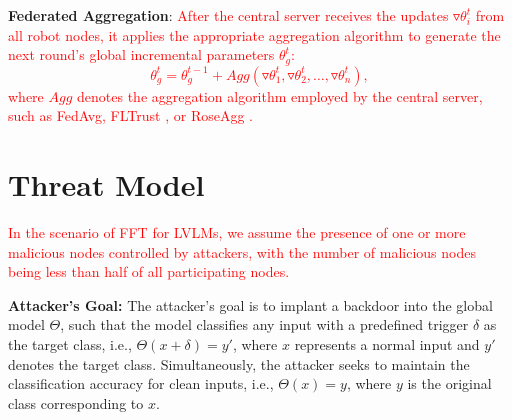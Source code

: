 \documentclass[lettersize,journal]{IEEEtran}
\begin{document}
\textbf{Federated Aggregation}:
\textcolor{red}{After the central server receives the updates $\triangledown \theta_i^t$ from all robot nodes, it applies the appropriate aggregation algorithm to generate the next round's global incremental parameters $\theta_g^t$:
\begin{equation}
    \theta_g^t = \theta_g^{t-1} + Agg(\triangledown \theta_1^t, \triangledown \theta_2^t, \dots, \triangledown \theta_n^t),
\end{equation}
where $Agg$ denotes the aggregation algorithm employed by the central server, such as FedAvg, FLTrust \cite{cao2020fltrust}, or RoseAgg \cite{yang2024roseagg}.}


\section{Threat Model}
\textcolor{red}{In the scenario of FFT for LVLMs, we assume the presence of one or more malicious nodes controlled by attackers, with the number of malicious nodes being less than half of all participating nodes.}

\textbf{Attacker's Goal:} The attacker's goal is to implant a backdoor into the global model $\Theta$, such that the model classifies any input with a predefined trigger $\delta$ as the target class, i.e., $\Theta(x + \delta) = y'$, where $x$ represents a normal input and $y'$ denotes the target class. Simultaneously, the attacker seeks to maintain the classification accuracy for clean inputs, i.e., $\Theta(x) = y$, where $y$ is the original class corresponding to $x$.
\end{document}

